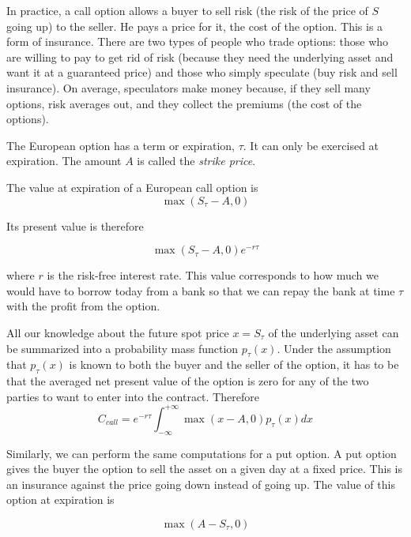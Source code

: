 \documentclass[justified, sixbynine]{tufte-book}
\theoremstyle{plain}%
\newtheorem * {corollary}{Corollary}
\theoremstyle{definition}
\theoremstyle{remark}
\newtheorem * {remark}{Remark}
\newtheorem * {note}{Note}
\begin{document}
\begin{fullwidth}
In practice, a call option allows a buyer to sell risk (the risk of the price of $S$ going up) to the seller. He pays a price for it, the cost of the option. This is a form of insurance. There are two types of people who trade options: those who are willing to pay to get rid of risk (because they need the underlying asset and want it at a guaranteed price) and those who simply speculate (buy risk and sell insurance). On average, speculators make money because, if they sell many options, risk averages out, and they collect the premiums (the cost of the options).

The European option has a term or expiration, $\tau$. It can only be exercised at expiration. The amount $A$ is called the {\it strike price}.

The value at expiration of a European call option is
\begin{equation}
\max (S_\tau -A, 0)
\end{equation}

Its present value is therefore

\begin{equation}
\max (S_\tau -A, 0) e^{-r\tau}
\end{equation}

where $r$ is the risk-free interest rate. This value corresponds to how much we would have to borrow today from a bank so that we can repay the bank at time $\tau$ with the profit from the option.

All our knowledge about the future spot price $x=S_\tau $ of the underlying
asset can be summarized into a probability mass function $p_\tau (x)$. Under
the assumption that $p_\tau (x)$ is known to both the buyer and the seller
of the option, it has to be that the averaged net present value of the
option is zero for any of the two parties to want to enter into the contract.
Therefore
\begin{equation}
C_{call}=e^{-r\tau }\int_{-\infty }^{+\infty }\max (x-A, 0)p_\tau (x)dx
\label{call_option}
\end{equation}


Similarly, we can perform the same computations for a put option. A put option gives the buyer the option to sell the asset on a given day at a fixed price. This is an insurance against the price going down instead of going up. The value of this option at expiration is

\begin{equation}
\max (A-S_\tau, 0)
\end{equation}


\end{fullwidth}
\end{document}
